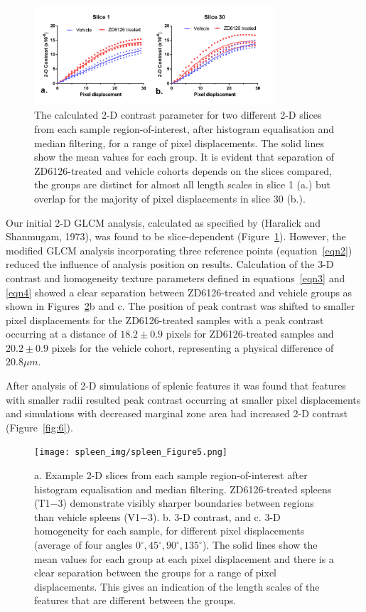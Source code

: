 	
	\begin{figure}%
		\centering
		\includegraphics[width=0.8\textwidth]{spleen_img/spleen_Figure4.jpg}
		\caption{The calculated 2-D contrast parameter for two different 2-D slices from each sample region-of-interest, after histogram equalisation and median filtering, for a range of pixel displacements. The solid lines show the mean values for each group. It is evident that separation of ZD6126-treated and vehicle cohorts depends on the slices compared, the groups are distinct for almost all length scales in slice 1 (a.) but overlap for the majority of pixel displacements in slice 30 (b.). }
		\label{fig:4}
	\end{figure}
	
	
	Our initial 2-D GLCM analysis, calculated as specified by (Haralick and Shanmugam, 1973), 
	was found to be slice-dependent (Figure~\ref{fig:4}). However, the modified GLCM analysis incorporating three reference points (equation~\ref{eqn2}) reduced the influence of analysis position on results. Calculation of the 3-D contrast and homogeneity texture parameters defined in equations~\ref{eqn3} and \ref{eqn4} showed a clear separation between ZD6126-treated and vehicle groups as shown in Figures~\ref{fig:5}b and c. The position of peak contrast was shifted to smaller pixel displacements for the ZD6126-treated samples with a peak contrast occurring at a distance of $18.2 \pm 0.9$ pixels for ZD6126-treated samples and $20.2 \pm 0.9$ pixels for the vehicle cohort, representing a physical difference of $20.8\mu m$.
	
	After analysis of 2-D simulations of splenic features it was found that features with smaller radii resulted peak contrast occurring at smaller pixel displacements and simulations with decreased marginal zone area had increased 2-D contrast (Figure~\ref{fig:6}). 
	
	\begin{figure}%
		\centering
		\texttt{[image: spleen\_img/spleen\_Figure5.png]}
		\caption{a. Example 2-D slices from each sample region-of-interest after histogram equalisation and median filtering. ZD6126-treated spleens (T1−3) demonstrate visibly sharper boundaries between regions than vehicle spleens (V1−3). b. 3-D contrast, and c. 3-D homogeneity for each sample, for different pixel displacements (average of four angles $0^{\circ}, 45^{\circ}, 90^{\circ}, 135^{\circ}$). The solid lines show the mean values for each group at each pixel displacement and there is a clear separation between the groups for a range of pixel displacements. This gives an indication of the length scales of the features that are different between the groups.}
		\label{fig:5}
	\end{figure}
	
